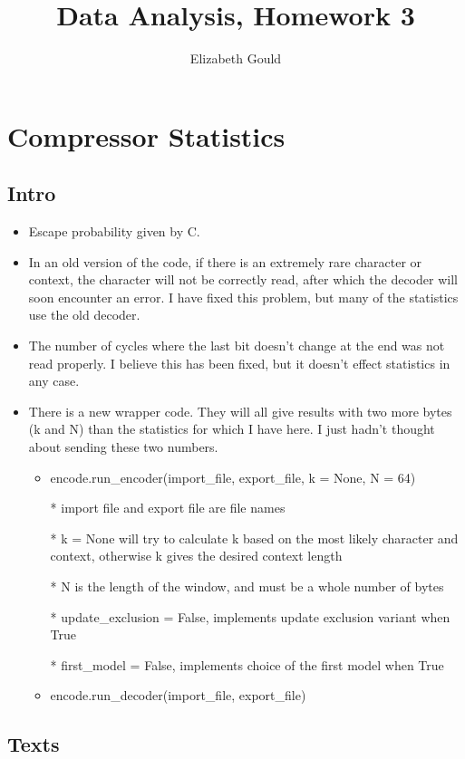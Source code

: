 \documentclass{article}
\title{Data Analysis, Homework 3}
\author{Elizabeth Gould}
\begin{document}
\maketitle

\section{Compressor Statistics}

\subsection{Intro}

\begin{itemize}
\item Escape probability given by C.
\item In an old version of the code, if there is an extremely rare character or context, the character will not be correctly read, after which the decoder will soon encounter an error. I have fixed this problem, but many of the statistics use the old decoder. 
\item The number of cycles where the last bit doesn't change at the end was not read properly. I believe this has been fixed, but it doesn't effect statistics in any case.
\item There is a new wrapper code. They will all give results with two more bytes (k and N) than the statistics for which I have here. I just hadn't thought about sending these two numbers. 
\begin{itemize}
\item encode.run\_encoder(import\_file, export\_file, k = None, N = 64)
\item[*] import file and export file are file names
\item[*] k = None will try to calculate k based on the most likely character and context, otherwise k gives the desired context length
\item[*] N is the length of the window, and must be a whole number of bytes
\item[*] update\_exclusion = False, implements update exclusion variant when True
\item[*] first\_model = False, implements choice of the first model when True
\item encode.run\_decoder(import\_file, export\_file)
\end{itemize}
\end{itemize}

\subsection{Texts} 
\end{document}
